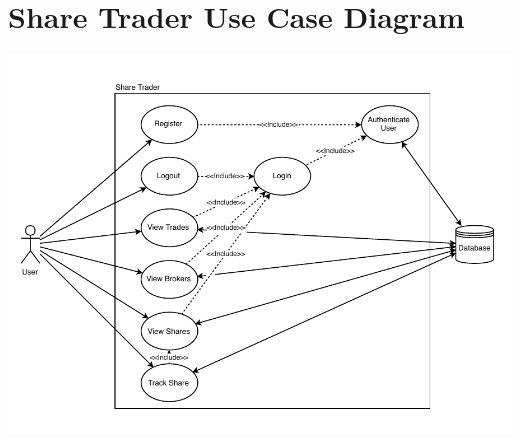 \documentclass[12pt, a4paper,titlepage]{article}
\begin{document}
\section{Share Trader Use Case Diagram}
\includegraphics[width=\textwidth]{res/share_trader_uc.pdf}
\label{ap-uc}
\end{document}
